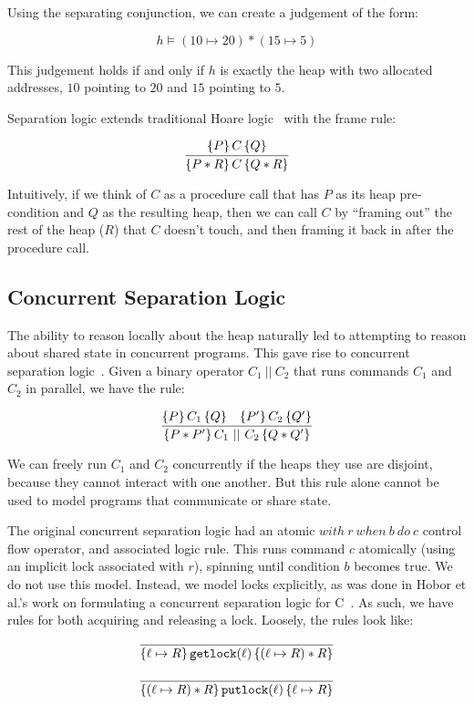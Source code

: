 Using the separating conjunction, we can create a judgement of the form:

\[ h \vDash (10\mapsto20) * (15\mapsto5) \]

This judgement holds if and only if $h$ is exactly the heap with two allocated
addresses, $10$ pointing to $20$ and $15$ pointing to $5$.

Separation logic extends traditional Hoare logic~\cite{hoare1969axiomatic} with
the frame rule:

\[
\infer{\hoaretrip{P * R}{C}{Q * R}}{\hoaretrip{P}{C}{Q}}
\]

Intuitively, if we think of $C$ as a procedure call that has $P$ as its heap
pre-condition and $Q$ as the resulting heap, then we can call $C$ by ``framing
out'' the rest of the heap ($R$) that $C$ doesn't touch, and then framing it
back in after the procedure call.

\subsection{Concurrent Separation Logic}

The ability to reason locally about the heap naturally led to attempting to
reason about shared state in concurrent programs.
This gave rise to concurrent
separation logic~\cite{o2007resources}.
Given a binary operator $C_1~||~C_2$ that
runs commands $C_1$ and $C_2$ in parallel, we have the rule:

\[
    \infer{\hoaretrip{P * P'}{C_1~||~C_2}{Q * Q'}}{\hoaretrip{P}{C_1}{Q} &
                                                     \hoaretrip{P'}{C_2}{Q'}}
\]

We can freely run $C_1$ and $C_2$ concurrently if the heaps they use are
disjoint, because they cannot interact with one another.
But this rule alone cannot be used to model
programs that communicate or share state.

The original concurrent separation logic had an atomic
$\mathit{with~} r \mathit{~when~} b \mathit{~do~} c$
control flow operator, and associated logic rule.
This runs command $c$
atomically (using an implicit lock associated with $r$),
spinning until condition $b$ becomes true.
We do not use this model.
Instead, we model locks explicitly, as was done in Hobor et al.'s work on
formulating a concurrent separation logic for C~\cite{hobor2008oracle}.
As such, we have rules for both acquiring and
releasing a lock.
Loosely, the rules look like:

\begin{align*}
    \infer{\hoaretrip{\ell \mapsto R}{\texttt{getlock}(\ell)}{(\ell \mapsto R) *
    R}}{} \\[+9px]
    \infer{\hoaretrip{(\ell \mapsto R) * R}{\texttt{putlock}(\ell)}{\ell \mapsto R}}{}
\end{align*}

